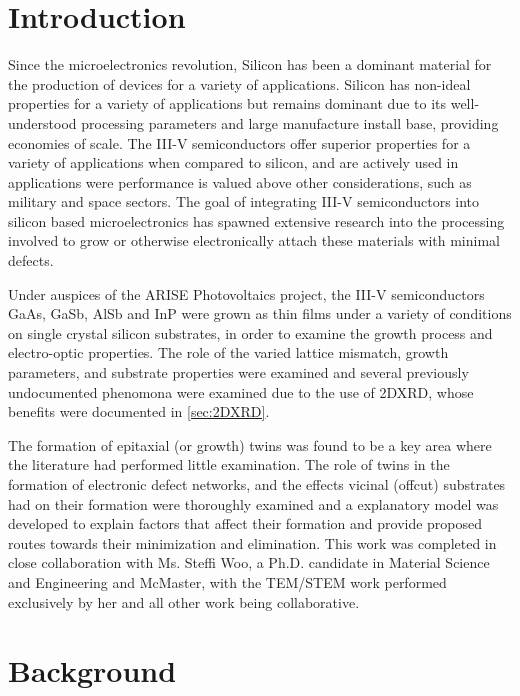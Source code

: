 \section{Introduction}
Since the microelectronics revolution, Silicon has been a dominant material 
for the production of devices for a variety of applications. Silicon has 
non-ideal properties for a variety of applications but remains dominant due 
to its well-understood processing parameters and large manufacture install 
base, providing economies of scale. The III-V semiconductors offer superior 
properties for a variety of applications when compared to silicon, and are 
actively used in applications were performance is valued above other 
considerations, such as military and space sectors. The goal of integrating 
III-V semiconductors into silicon based microelectronics has spawned extensive 
research into the processing involved to grow or otherwise electronically 
attach these materials with minimal defects.

Under auspices of the ARISE Photovoltaics project, the III-V 
semiconductors GaAs, GaSb, AlSb and InP were grown as thin films under a 
variety of conditions on single crystal silicon substrates, in order to 
examine the growth process and electro-optic properties. The role of the 
varied lattice mismatch, growth parameters, and substrate properties were 
examined and several previously undocumented phenomona were examined due to 
the use of 2DXRD, whose benefits were documented in \cref{sec:2DXRD}.

The formation of epitaxial (or growth) twins was found to be a key area where 
the literature had performed little examination. The role of twins in the 
formation of electronic defect networks, and the effects vicinal (offcut) 
substrates had on their formation were thoroughly examined and a 
explanatory model was developed to explain factors that affect their formation 
and provide proposed routes towards their minimization and 
elimination\cite{Devenyi2011}. This work was completed in close collaboration 
with Ms. Steffi Woo, a Ph.D. candidate in Material Science and Engineering and 
McMaster, with the TEM/STEM work performed exclusively by her and all other 
work being collaborative.

\section{Background}

